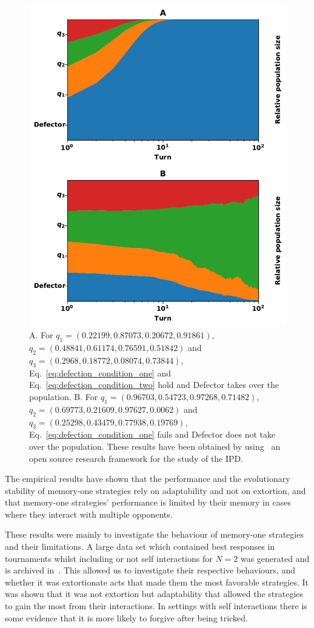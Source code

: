 \documentclass[10pt]{article}
\begin{document}
\begin{figure}[!htbp]
    \centering
    \includegraphics[width=.4\linewidth]{img/stability_of_defection_plots.pdf}
    \caption{A. For \(q_{1}=(0.22199, 0.87073, 0.20672, 0.91861)\),
    $q_{2}=(0.48841, 0.61174, 0.76591, 0.51842)$ and
    $q_{3}=(0.2968, 0.18772, 0.08074, 0.73844)$, Eq.~\ref{eq:defection_condition_one} and
    Eq.~\ref{eq:defection_condition_two} hold and Defector takes over the
    population. B. For $q_{1}=(0.96703, 0.54723, 0.97268, 0.71482)$,
    $q_{2}=(0.69773, 0.21609, 0.97627, 0.0062)$ and
    $q_{3}=(0.25298, 0.43479, 0.77938, 0.19769)$, Eq.~\ref{eq:defection_condition_one} fails
    and Defector does not take over the population.
    These results have been obtained by using~\cite{axelrodproject} an open
    source research framework for the study of the IPD.}\label{fig:stability_of_defection}
\end{figure}

The empirical results have shown that the performance and the evolutionary
stability of memory-one strategies rely on adaptability and not on extortion,
and that memory-one strategies' performance is limited by their memory in cases
where they interact with multiple opponents.

These results were mainly to investigate the
behaviour of memory-one strategies and their limitations. A large data set which
contained best responses in tournaments whilst including or not self
interactions for \(N=2\)
was generated and is archived in~\cite{glynatsi2019}. This allowed us to investigate their respective behaviours, and
whether it was extortionate acts that made them the most favorable strategies.
It was shown that it was not extortion but adaptability that allowed
the strategies to gain the most from their interactions. In settings with self interactions
there
is some evidence that it is more likely to forgive after being tricked.
\end{document}
